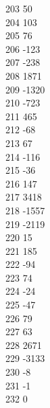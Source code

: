 { 203	50 \\
 204	103 \\
 205	76 \\
 206	-123 \\
 207	-238 \\
 208	1871 \\
 209	-1320 \\
 210	-723 \\
 211	465 \\
 212	-68 \\
 213	67 \\
 214	-116 \\
 215	-36 \\
 216	147 \\
 217	3418 \\
 218	-1557 \\
 219	-2119 \\
 220	15 \\
 221	185 \\
 222	-94 \\
 223	74 \\
 224	-24 \\
 225	-47 \\
 226	79 \\
 227	63 \\
 228	2671 \\
 229	-3133 \\
 230	-8 \\
 231	-1 \\
 232	0 \\
}
